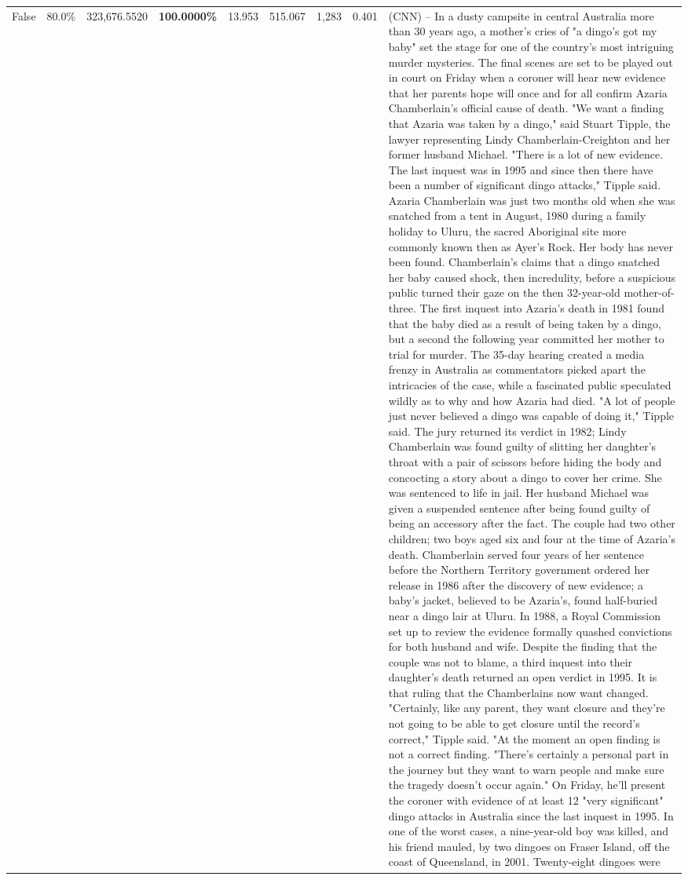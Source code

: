 \begin{table}[H]
\begin{tabular}{lllrlllll}
False & 80.0\% & 323,676.5520 & \bfseries \color{red} 100.0000\% & 13.953 & 515.067 & 1,283 & 0.401 & (CNN) -- In a dusty campsite in central Australia more than 30 years ago, a mother's cries of "a dingo's got my baby" set the stage for one of the country's most intriguing murder mysteries. The final scenes are set to be played out in court on Friday when a coroner will hear new evidence that her parents hope will once and for all confirm Azaria Chamberlain's official cause of death. "We want a finding that Azaria was taken by a dingo," said Stuart Tipple, the lawyer representing Lindy Chamberlain-Creighton and her former husband Michael. "There is a lot of new evidence. The last inquest was in 1995 and since then there have been a number of significant dingo attacks," Tipple said. Azaria Chamberlain was just two months old when she was snatched from a tent in August, 1980 during a family holiday to Uluru, the sacred Aboriginal site more commonly known then as Ayer's Rock. Her body has never been found. Chamberlain's claims that a dingo snatched her baby caused shock, then incredulity, before a suspicious public turned their gaze on the then 32-year-old mother-of-three. The first inquest into Azaria's death in 1981 found that the baby died as a result of being taken by a dingo, but a second the following year committed her mother to trial for murder. The 35-day hearing created a media frenzy in Australia as commentators picked apart the intricacies of the case, while a fascinated public speculated wildly as to why and how Azaria had died. "A lot of people just never believed a dingo was capable of doing it," Tipple said. The jury returned its verdict in 1982; Lindy Chamberlain was found guilty of slitting her daughter's throat with a pair of scissors before hiding the body and concocting a story about a dingo to cover her crime. She was sentenced to life in jail. Her husband Michael was given a suspended sentence after being found guilty of being an accessory after the fact. The couple had two other children; two boys aged six and four at the time of Azaria's death. Chamberlain served four years of her sentence before the Northern Territory government ordered her release in 1986 after the discovery of new evidence; a baby's jacket, believed to be Azaria's, found half-buried near a dingo lair at Uluru. In 1988, a Royal Commission set up to review the evidence formally quashed convictions for both husband and wife. Despite the finding that the couple was not to blame, a third inquest into their daughter's death returned an open verdict in 1995. It is that ruling that the Chamberlains now want changed. "Certainly, like any parent, they want closure and they're not going to be able to get closure until the record's correct," Tipple said. "At the moment an open finding is not a correct finding. "There's certainly a personal part in the journey but they want to warn people and make sure the tragedy doesn't occur again." On Friday, he'll present the coroner with evidence of at least 12 "very significant" dingo attacks in Australia since the last inquest in 1995. In one of the worst cases, a nine-year-old boy was killed, and his friend mauled, by two dingoes on Fraser Island, off the coast of Queensland, in 2001. Twenty-eight dingoes were 
\end{tabular}
\end{table}

